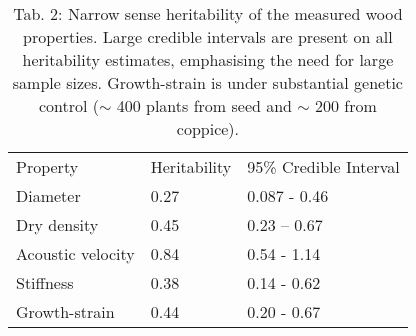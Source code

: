 
\begin{table}
\centering
\caption{Tab. 2: Narrow sense heritability of the measured wood properties. Large credible intervals are present on all heritability estimates, emphasising the need for large sample sizes. Growth-strain is under substantial genetic control (\(\sim\) 400 plants from seed and \(\sim\) 200 from coppice).}
\begin{tabular}{lll}
Property          & Heritability & 95\% Credible Interval \\
Diameter          & 0.27         & 0.087 - 0.46           \\
Dry density       & 0.45         & 0.23 – 0.67            \\
Acoustic velocity & 0.84         & 0.54 - 1.14            \\
Stiffness         & 0.38         & 0.14 - 0.62            \\
Growth-strain     & 0.44         & 0.20 - 0.67           
\end{tabular}
\end{table}